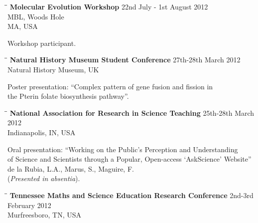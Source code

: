 \documentclass{res}
\begin{document}
\begin{resume}
\begin{tabbing}
\hspace{2in}\= \hspace{2.6in}\= \kill
{\bf Molecular Evolution Workshop} \> \> 22nd July - 1st August 2012\\
\> \> MBL, Woods Hole \\
\> \> MA, USA \\
\end{tabbing}\vspace{-40pt}
Workshop participant.

\vspace{-0.1in}
 \begin{tabbing}
   \hspace{2in}\= \hspace{2.6in}\= \kill 
    {\bf Natural History Museum Student Conference } \>  \> 27th-28th March 2012\\
                        \>     \> Natural History Museum, UK
   \end{tabbing}\vspace{-20pt}      
   
 Poster presentation: ``Complex pattern of gene fusion and fission in \\ the Pterin folate biosynthesis pathway''.
  
  
   \vspace{-0.1in}
   \begin{tabbing}
   \hspace{2in}\= \hspace{2.6in}\= \kill 
   {\bf National Association for Research in Science Teaching } \>  \> 25th-28th March 2012\\
                        \>     \> Indianapolis, IN, USA
   \end{tabbing}\vspace{-20pt}      
Oral presentation: ``Working on the Public's Perception and Understanding \\of Science and Scientists
through a Popular, Open-access `AskScience' Website'' \\
de la Rubia, L.A., Marus, S., Maguire, F. \\
(\emph{Presented in absentia}).
   
   
   
   \vspace{-0.1in}
    \begin{tabbing}
   \hspace{2in}\= \hspace{2.6in}\= \kill 
    {\bf Tennessee Maths and Science Education Research Conference} \>  \> 2nd-3rd February 2012\\
                        \>     \> Murfreesboro, TN, USA
   \end{tabbing}
   

\end{resume}
\end{document}
